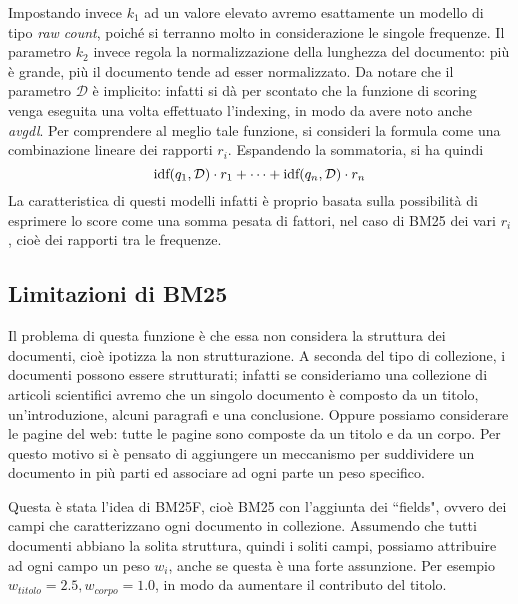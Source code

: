 Impostando invece $k_1$ ad un valore elevato avremo esattamente un modello di tipo \textit{raw count}, poiché
si terranno molto in considerazione le singole frequenze.
Il parametro $k_2$ invece regola la normalizzazione della lunghezza del documento: più è grande,
più il documento tende ad esser normalizzato.
Da notare che il parametro $\mathcal{D}$ è implicito: infatti si dà per scontato che
la funzione di scoring venga
eseguita una volta effettuato l'indexing, in modo da avere noto anche \textit{avgdl}.
Per comprendere al meglio tale funzione, si consideri la formula come una combinazione
lineare dei rapporti $r_i$. Espandendo la sommatoria, si ha quindi
$$
\text{idf}(q_1, \mathcal{D}) \cdot r_1 + \dots + \text{idf}(q_n, \mathcal{D}) \cdot r_n
$$
La caratteristica di questi modelli infatti è proprio basata sulla possibilità di esprimere lo score come una somma pesata
di fattori, nel caso di BM25 dei vari $r_i$,  cioè dei rapporti tra le frequenze.

\subsection{Limitazioni di BM25}

Il problema di questa funzione è che essa non considera la struttura dei documenti, cioè ipotizza
la non strutturazione.
A seconda del tipo di collezione, i documenti possono essere strutturati; infatti
se consideriamo una collezione di articoli scientifici avremo che un singolo documento è composto da un titolo, 
un'introduzione, alcuni paragrafi e una conclusione.
Oppure possiamo considerare le pagine del web: tutte le pagine sono composte da un titolo e da un corpo.
Per questo motivo si è pensato di aggiungere un meccanismo per suddividere un documento in
più parti ed associare ad ogni parte un peso specifico.

Questa è stata l'idea di BM25F, cioè BM25 con l'aggiunta dei ``fields", ovvero dei campi che caratterizzano ogni documento in collezione.
Assumendo che tutti documenti abbiano la solita struttura, quindi i soliti campi,
possiamo attribuire ad ogni campo un peso  $w_i$, anche se questa è una forte assunzione.
Per esempio $w_{titolo} = 2.5, w_{corpo} = 1.0$, in modo da aumentare il contributo del titolo.

\pagebreak

